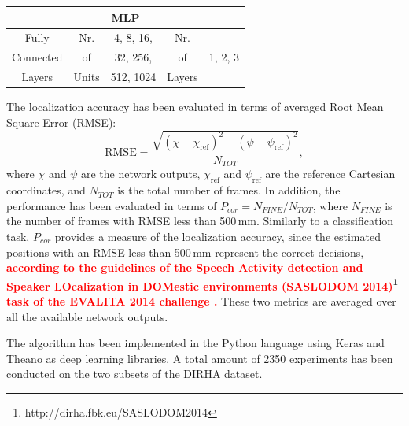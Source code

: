 \documentclass[review]{elsarticle}
\begin{document}
\begin{table}[t]
{\begin{tabular} { c|c|c|c|c|c|c|c}
		\hline
		\multicolumn{8}{c}{MLP}\\
		\hline
		Fully  & Nr.  & \multicolumn{3}{|c|}{4, 8, 16,} & Nr. &  \multicolumn{2}{|c}{ }\\
		Connected	& of & \multicolumn{3}{|c|}{32, 256,} & of & \multicolumn{2}{|c}{ 1, 2, 3}\\
		Layers	& Units & \multicolumn{3}{|c|}{512, 1024} & Layers & \multicolumn{2}{|c}{} \\
		\hline                                                                      
	\end{tabular}
	}
\end{table}


The localization accuracy has been evaluated in terms of averaged Root Mean Square Error (RMSE):
\begin{equation}
\text{RMSE} = \frac{\sqrt{(\chi-\chi_{\text{ref}})^2 + (\psi-\psi_{\text{ref}})^2}}{N_{TOT}},
\end{equation}
where $\chi$ and $\psi$  are the network outputs, $\chi_{\text{ref}}$ and $\psi_{\text{ref}}$ are the reference Cartesian coordinates, and $N_{TOT}$ is the total number of frames.
In addition, the performance has been evaluated in terms of $P_{cor} = N_{FINE}/N_{TOT}$, where $N_{FINE}$ is the 
number of frames with RMSE less than 500\,mm. 
Similarly to a classification task, $P_{cor}$ provides a measure of the localization accuracy, since the estimated positions with an RMSE less than 500\,mm represent the correct decisions, \textcolor{red}{\textbf{according to the guidelines of the Speech Activity detection and Speaker LOcalization in DOMestic environments (SASLODOM 2014)\footnote{http://dirha.fbk.eu/SASLODOM2014} task of the EVALITA 2014 challenge \cite{basili2014proceedings}.}} These two metrics are averaged over all the available network outputs. 

The algorithm has been implemented in the Python language using Keras \cite{chollet2015keras} and Theano \cite{2016arXiv160502688short} as deep learning libraries. A total amount of 2350 experiments has been conducted on the two subsets of the DIRHA dataset.

\end{document}
